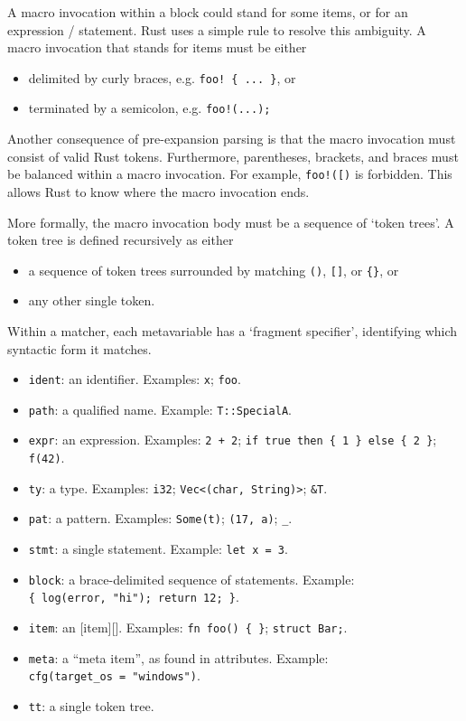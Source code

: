 \documentclass[a4paper,]{book}
\begin{document}
A macro invocation within a block could stand for some items, or for an
expression / statement. Rust uses a simple rule to resolve this
ambiguity. A macro invocation that stands for items must be either

\begin{itemize}
\itemsep1pt\parskip0pt
\item
  delimited by curly braces, e.g. \texttt{foo!\ \{\ ...\ \}}, or
\item
  terminated by a semicolon, e.g. \texttt{foo!(...);}
\end{itemize}

Another consequence of pre-expansion parsing is that the macro
invocation must consist of valid Rust tokens. Furthermore, parentheses,
brackets, and braces must be balanced within a macro invocation. For
example, \texttt{foo!({[})} is forbidden. This allows Rust to know where
the macro invocation ends.

More formally, the macro invocation body must be a sequence of `token
trees'. A token tree is defined recursively as either

\begin{itemize}
\itemsep1pt\parskip0pt
\item
  a sequence of token trees surrounded by matching \texttt{()},
  \texttt{{[}{]}}, or \texttt{\{\}}, or
\item
  any other single token.
\end{itemize}

Within a matcher, each metavariable has a `fragment specifier',
identifying which syntactic form it matches.

\begin{itemize}
\itemsep1pt\parskip0pt
\item
  \texttt{ident}: an identifier. Examples: \texttt{x}; \texttt{foo}.
\item
  \texttt{path}: a qualified name. Example: \texttt{T::SpecialA}.
\item
  \texttt{expr}: an expression. Examples: \texttt{2\ +\ 2};
  \texttt{if\ true\ then\ \{\ 1\ \}\ else\ \{\ 2\ \}}; \texttt{f(42)}.
\item
  \texttt{ty}: a type. Examples: \texttt{i32};
  \texttt{Vec\textless{}(char,\ String)\textgreater{}}; \texttt{\&T}.
\item
  \texttt{pat}: a pattern. Examples: \texttt{Some(t)};
  \texttt{(17,\ \textquotesingle{}a\textquotesingle{})}; \texttt{\_}.
\item
  \texttt{stmt}: a single statement. Example: \texttt{let\ x\ =\ 3}.
\item
  \texttt{block}: a brace-delimited sequence of statements. Example:
  \texttt{\{\ log(error,\ "hi");\ return\ 12;\ \}}.
\item
  \texttt{item}: an {[}item{]}{[}{]}. Examples:
  \texttt{fn\ foo()\ \{\ \}}; \texttt{struct\ Bar;}.
\item
  \texttt{meta}: a ``meta item'', as found in attributes. Example:
  \texttt{cfg(target\_os\ =\ "windows")}.
\item
  \texttt{tt}: a single token tree.
\end{itemize}
\end{document}
